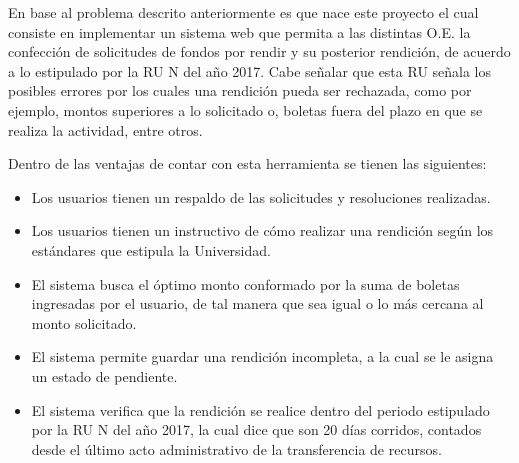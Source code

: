 En base al problema descrito anteriormente es que nace este proyecto el cual consiste en implementar un sistema web que permita a las distintas O.E. la confección de solicitudes de fondos por rendir y su posterior rendición, de acuerdo a lo estipulado por la RU N del año 2017. Cabe señalar que esta RU señala los posibles errores por los cuales una rendición pueda ser rechazada, como por ejemplo, montos superiores a lo solicitado o, boletas fuera del plazo en que se realiza la actividad, entre otros.

Dentro de las ventajas de contar con esta herramienta se tienen las siguientes:

\begin{itemize}
    \item Los usuarios tienen un respaldo de las solicitudes y resoluciones realizadas.
    \item Los usuarios tienen un instructivo de cómo realizar una rendición según los estándares que estipula la Universidad.
    \item El sistema busca el óptimo monto conformado por la suma de boletas ingresadas por el usuario, de tal manera que sea igual o lo más cercana al monto solicitado.
    \item El sistema permite guardar una rendición incompleta, a la cual se le asigna un estado de pendiente.
    \item El sistema verifica que la rendición se realice dentro del periodo estipulado por la RU N del año 2017, la cual dice que son 20 días corridos, contados desde el último acto administrativo de la transferencia de recursos.
\end{itemize}

